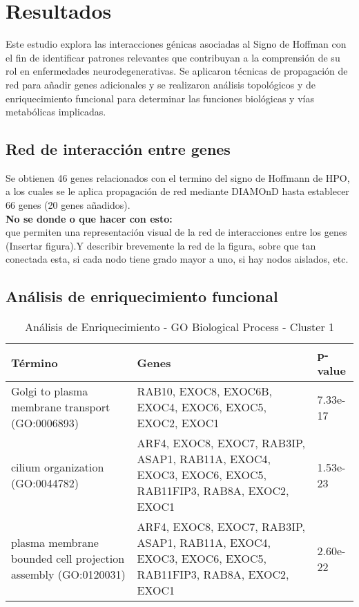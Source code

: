 \section{Resultados}

Este estudio explora las interacciones génicas asociadas al Signo de Hoffman con el fin de identificar patrones relevantes que contribuyan a la comprensión de su rol en enfermedades neurodegenerativas. Se aplicaron técnicas de propagación de red para añadir genes adicionales y se realizaron análisis topológicos y de enriquecimiento funcional para determinar las funciones biológicas y vías metabólicas implicadas.

\subsection{Red de interacción entre genes}


Se obtienen 46 genes relacionados con el termino del signo de Hoffmann de HPO, a los cuales se le aplica propagación de red mediante DIAMOnD hasta establecer 66 genes (20 genes añadidos).
\\

\textbf{No se donde o que hacer con esto:}\\

 que permiten una representación visual de la red de interacciones entre los genes (Insertar figura).Y describir brevemente la red de la figura, sobre que tan conectada esta, si cada nodo tiene grado mayor a uno, si hay nodos aislados, etc.
\vspace{4cm}

\subsection{Análisis de enriquecimiento funcional}

\begin{table}[ht]
	\centering
	\caption{Análisis de Enriquecimiento - GO Biological Process - Cluster 1}
	\begin{tabularx}{\textwidth}{|l|X|l|}
		\hline
		\textbf{Término} & \textbf{Genes} & \textbf{p-value} \\ \hline
		Golgi to plasma membrane transport (GO:0006893) & RAB10, EXOC8, EXOC6B, EXOC4, EXOC6, EXOC5, EXOC2, EXOC1 & 7.33e-17 \\ \hline
		cilium organization (GO:0044782) & ARF4, EXOC8, EXOC7, RAB3IP, ASAP1, RAB11A, EXOC4, EXOC3, EXOC6, EXOC5, RAB11FIP3, RAB8A, EXOC2, EXOC1 & 1.53e-23 \\ \hline
		plasma membrane bounded cell projection assembly (GO:0120031) & ARF4, EXOC8, EXOC7, RAB3IP, ASAP1, RAB11A, EXOC4, EXOC3, EXOC6, EXOC5, RAB11FIP3, RAB8A, EXOC2, EXOC1 & 2.60e-22 \\ \hline
	\end{tabularx}
\end{table}

